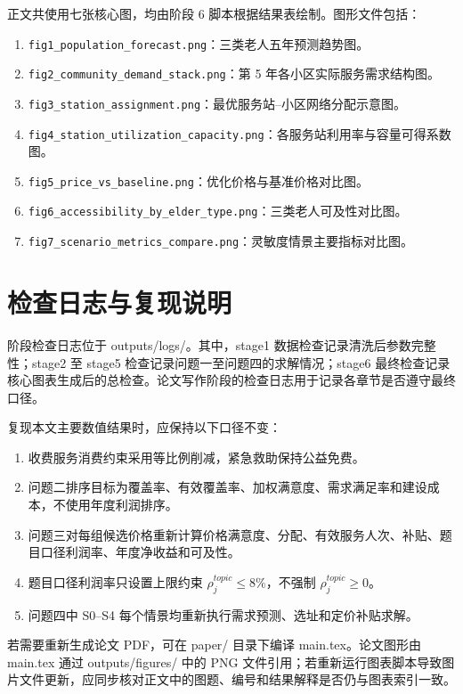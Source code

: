 正文共使用七张核心图，均由阶段 6 脚本根据结果表绘制。图形文件包括：
\begin{enumerate}
  \item \texttt{fig1\_population\_forecast.png}：三类老人五年预测趋势图。
  \item \texttt{fig2\_community\_demand\_stack.png}：第 5 年各小区实际服务需求结构图。
  \item \texttt{fig3\_station\_assignment.png}：最优服务站--小区网络分配示意图。
  \item \texttt{fig4\_station\_utilization\_capacity.png}：各服务站利用率与容量可得系数图。
  \item \texttt{fig5\_price\_vs\_baseline.png}：优化价格与基准价格对比图。
  \item \texttt{fig6\_accessibility\_by\_elder\_type.png}：三类老人可及性对比图。
  \item \texttt{fig7\_scenario\_metrics\_compare.png}：灵敏度情景主要指标对比图。
\end{enumerate}

\section{检查日志与复现说明}

阶段检查日志位于 outputs/logs/。其中，stage1 数据检查记录清洗后参数完整性；stage2 至 stage5 检查记录问题一至问题四的求解情况；stage6 最终检查记录核心图表生成后的总检查。论文写作阶段的检查日志用于记录各章节是否遵守最终口径。

复现本文主要数值结果时，应保持以下口径不变：
\begin{enumerate}
  \item 收费服务消费约束采用等比例削减，紧急救助保持公益免费。
  \item 问题二排序目标为覆盖率、有效覆盖率、加权满意度、需求满足率和建设成本，不使用年度利润排序。
  \item 问题三对每组候选价格重新计算价格满意度、分配、有效服务人次、补贴、题目口径利润率、年度净收益和可及性。
  \item 题目口径利润率只设置上限约束 $\rho_j^{topic}\le8\%$，不强制 $\rho_j^{topic}\ge0$。
  \item 问题四中 S0--S4 每个情景均重新执行需求预测、选址和定价补贴求解。
\end{enumerate}

若需要重新生成论文 PDF，可在 paper/ 目录下编译 main.tex。论文图形由 main.tex 通过 outputs/figures/ 中的 PNG 文件引用；若重新运行图表脚本导致图片文件更新，应同步核对正文中的图题、编号和结果解释是否仍与图表索引一致。
